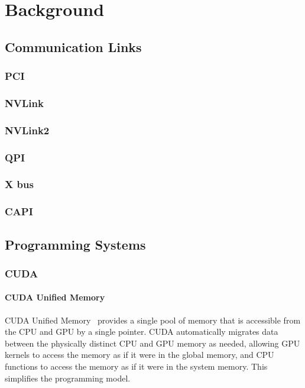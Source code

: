 \chapter{Background}


%
%
%
\section{Communication Links}

\subsection{PCI}
\subsection{NVLink}
\subsection{NVLink2}
\subsection{QPI}
\subsection{X bus}
\subsection{CAPI}

%
%
%
\section{Programming Systems}
\subsection{CUDA}
\label{sec:cuda}

\subsubsection{CUDA Unified Memory}

CUDA Unified Memory~\cite{harris2013cudaunifiedmemory} provides a single pool of memory that is accessible from the CPU and GPU by a single pointer.
CUDA automatically migrates data between the physically distinct CPU and GPU memory as needed, allowing GPU kernels to access the memory as if it were in the global memory, and CPU functions to access the memory as if it were in the system memory.
This simplifies the programming model.

